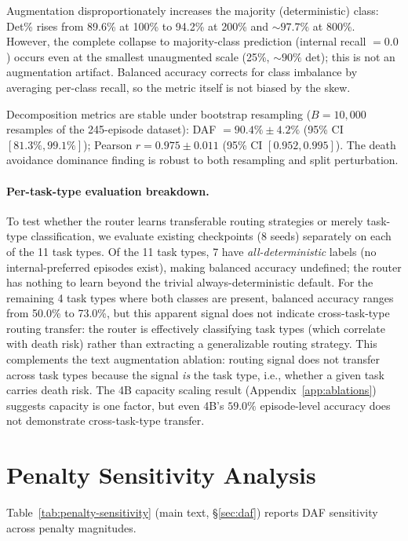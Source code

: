 \documentclass[11pt]{article}
\begin{document}
Augmentation disproportionately increases the majority (deterministic) class: Det\% rises from 89.6\% at 100\% to 94.2\% at 200\% and ${\sim}97.7\%$ at 800\%. However, the complete collapse to majority-class prediction (internal recall $= 0.0$) occurs even at the smallest unaugmented scale (25\%, ${\sim}90\%$ det); this is not an augmentation artifact. Balanced accuracy corrects for class imbalance by averaging per-class recall, so the metric itself is not biased by the skew.

Decomposition metrics are stable under bootstrap resampling ($B{=}10{,}000$ resamples of the 245-episode dataset): DAF $= 90.4\% \pm 4.2\%$ (95\% CI $[81.3\%, 99.1\%]$); Pearson $r = 0.975 \pm 0.011$ (95\% CI $[0.952, 0.995]$). The death avoidance dominance finding is robust to both resampling and split perturbation.

\paragraph{Per-task-type evaluation breakdown.} To test whether the router learns transferable routing strategies or merely task-type classification, we evaluate existing checkpoints (8 seeds) separately on each of the 11 task types. Of the 11 task types, 7 have \emph{all-deterministic} labels (no internal-preferred episodes exist), making balanced accuracy undefined; the router has nothing to learn beyond the trivial always-deterministic default. For the remaining 4 task types where both classes are present, balanced accuracy ranges from 50.0\% to 73.0\%, but this apparent signal does not indicate cross-task-type routing transfer: the router is effectively classifying task types (which correlate with death risk) rather than extracting a generalizable routing strategy. This complements the text augmentation ablation: routing signal does not transfer across task types because the signal \emph{is} the task type, i.e., whether a given task carries death risk. The 4B capacity scaling result (Appendix~\ref{app:ablations}) suggests capacity is one factor, but even 4B's $59.0\%$ episode-level accuracy does not demonstrate cross-task-type transfer.

\section{Penalty Sensitivity Analysis}
\label{app:penalty}

Table~\ref{tab:penalty-sensitivity} (main text, \S\ref{sec:daf}) reports DAF sensitivity across penalty magnitudes.
\end{document}
